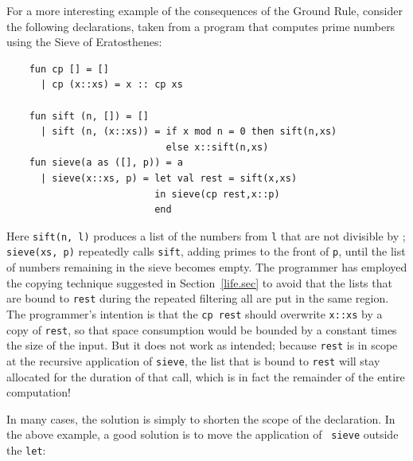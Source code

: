 \documentclass[12pt]{book}
\begin{document}
For a more interesting example of the consequences of the Ground Rule, 
consider the following declarations, taken from a program that
computes prime numbers using the Sieve of Eratosthenes:
\begin{verbatim}
    fun cp [] = []
      | cp (x::xs) = x :: cp xs 

    fun sift (n, []) = []
      | sift (n, (x::xs)) = if x mod n = 0 then sift(n,xs)
                            else x::sift(n,xs)
    fun sieve(a as ([], p)) = a
      | sieve(x::xs, p) = let val rest = sift(x,xs)
                          in sieve(cp rest,x::p)
                          end
\end{verbatim}
Here {\tt sift(n, l)} produces a list of the numbers from {\tt l} that
are not divisible by ; {\tt sieve(xs, p)} repeatedly calls
{\tt sift}, adding primes to the front of {\tt p}, until the list of numbers
remaining in the sieve becomes empty. The programmer has employed the copying
technique suggested in Section~\ref{life.sec} to avoid that the 
lists that are bound to {\tt rest} during the repeated filtering
all are  put in the same region. The programmer's intention is that the
{\tt cp rest} should overwrite {\tt x::xs} by a copy of {\tt rest}, so
that space consumption would be bounded by a constant times the size of
the input.  But it does not work as intended; because {\tt rest}
is in scope at the recursive application of {\tt sieve}, the list that
is bound to {\tt rest} will stay
allocated for the duration of that call, which is in fact the remainder of
the entire computation! 

In many cases, the solution is simply to shorten the scope of the declaration. 
In the above example, a good solution is to move the application of {\tt
sieve} outside the {\tt let}:\pagebreak
\end{document}
